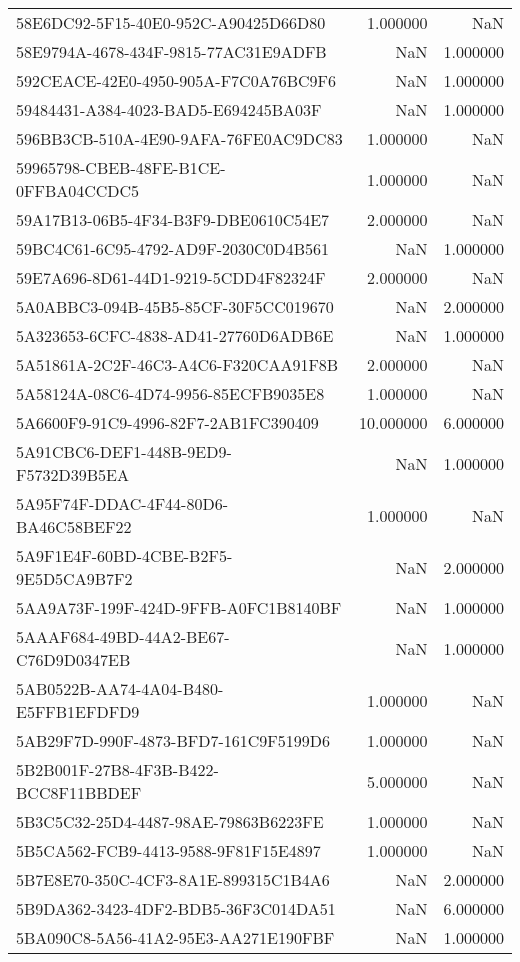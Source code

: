 \begin{tabular}{lrr}
58E6DC92-5F15-40E0-952C-A90425D66D80 & 1.000000 & NaN \\
58E9794A-4678-434F-9815-77AC31E9ADFB & NaN & 1.000000 \\
592CEACE-42E0-4950-905A-F7C0A76BC9F6 & NaN & 1.000000 \\
59484431-A384-4023-BAD5-E694245BA03F & NaN & 1.000000 \\
596BB3CB-510A-4E90-9AFA-76FE0AC9DC83 & 1.000000 & NaN \\
59965798-CBEB-48FE-B1CE-0FFBA04CCDC5 & 1.000000 & NaN \\
59A17B13-06B5-4F34-B3F9-DBE0610C54E7 & 2.000000 & NaN \\
59BC4C61-6C95-4792-AD9F-2030C0D4B561 & NaN & 1.000000 \\
59E7A696-8D61-44D1-9219-5CDD4F82324F & 2.000000 & NaN \\
5A0ABBC3-094B-45B5-85CF-30F5CC019670 & NaN & 2.000000 \\
5A323653-6CFC-4838-AD41-27760D6ADB6E & NaN & 1.000000 \\
5A51861A-2C2F-46C3-A4C6-F320CAA91F8B & 2.000000 & NaN \\
5A58124A-08C6-4D74-9956-85ECFB9035E8 & 1.000000 & NaN \\
5A6600F9-91C9-4996-82F7-2AB1FC390409 & 10.000000 & 6.000000 \\
5A91CBC6-DEF1-448B-9ED9-F5732D39B5EA & NaN & 1.000000 \\
5A95F74F-DDAC-4F44-80D6-BA46C58BEF22 & 1.000000 & NaN \\
5A9F1E4F-60BD-4CBE-B2F5-9E5D5CA9B7F2 & NaN & 2.000000 \\
5AA9A73F-199F-424D-9FFB-A0FC1B8140BF & NaN & 1.000000 \\
5AAAF684-49BD-44A2-BE67-C76D9D0347EB & NaN & 1.000000 \\
5AB0522B-AA74-4A04-B480-E5FFB1EFDFD9 & 1.000000 & NaN \\
5AB29F7D-990F-4873-BFD7-161C9F5199D6 & 1.000000 & NaN \\
5B2B001F-27B8-4F3B-B422-BCC8F11BBDEF & 5.000000 & NaN \\
5B3C5C32-25D4-4487-98AE-79863B6223FE & 1.000000 & NaN \\
5B5CA562-FCB9-4413-9588-9F81F15E4897 & 1.000000 & NaN \\
5B7E8E70-350C-4CF3-8A1E-899315C1B4A6 & NaN & 2.000000 \\
5B9DA362-3423-4DF2-BDB5-36F3C014DA51 & NaN & 6.000000 \\
5BA090C8-5A56-41A2-95E3-AA271E190FBF & NaN & 1.000000 \\

\end{tabular}

